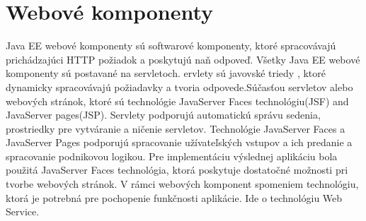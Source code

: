 \section{Webové komponenty}
Java EE webové komponenty sú softwarové komponenty, ktoré spracovávajú prichádzajúci HTTP požiadok a poskytujú naň odpoveď. Všetky Java EE webové komponenty sú postavané na servletoch. ervlety sú javovské triedy , ktoré dynamicky spracovávajú požiadavky a tvoria odpovede.Súčasťou servletov alebo webových stránok, ktoré sú technológie JavaServer Faces technológiu(JSF) and JavaServer pages(JSP). Servlety podporujú automatickú správu sedenia, prostriedky pre vytváranie a ničenie servletov.  Technológie JavaServer Faces a JavaServer Pages podporujú spracovanie užívateľských vstupov a ich predanie a spracovanie podnikovou logikou. Pre implementáciu výslednej aplikáciu bola použitá JavaServer Faces technológia, ktorá poskytuje dostatočné možnosti pri tvorbe webových stránok. V rámci webových komponent spomeniem technológiu, ktorá je potrebná pre pochopenie funkčnosti aplikácie. Ide o technológiu Web Service.



